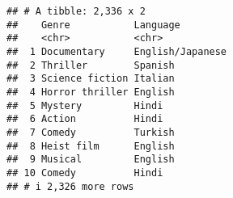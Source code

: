 \documentclass[
]{article}
\newenvironment{Shaded}{\begin{snugshade}}{\end{snugshade}}
\newcommand{\FunctionTok}[1]{\textcolor[rgb]{0.13,0.29,0.53}{\textbf{#1}}}
\newcommand{\NormalTok}[1]{#1}
\newcommand{\OtherTok}[1]{\textcolor[rgb]{0.56,0.35,0.01}{#1}}
\newcommand{\SpecialCharTok}[1]{\textcolor[rgb]{0.81,0.36,0.00}{\textbf{#1}}}
\begin{document}
\begin{verbatim}
## # A tibble: 2,336 x 2
##    Genre           Language        
##    <chr>           <chr>           
##  1 Documentary     English/Japanese
##  2 Thriller        Spanish         
##  3 Science fiction Italian         
##  4 Horror thriller English         
##  5 Mystery         Hindi           
##  6 Action          Hindi           
##  7 Comedy          Turkish         
##  8 Heist film      English         
##  9 Musical         English         
## 10 Comedy          Hindi           
## # i 2,326 more rows
\end{verbatim}

\begin{Shaded}
\end{Shaded}
\end{document}
